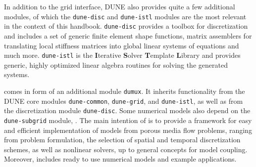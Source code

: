 In addition to the grid interface, DUNE also provides quite a few additional
modules, of which the \texttt{dune-disc} and \texttt{dune-istl} modules are the most
relevant in the context of this handbook.  \texttt{dune-disc} provides a toolbox for
discretization and includes a set of generic finite element shape
functions, matrix assemblers for translating local stiffness matrices
into global linear systems of equations and much more. \texttt{dune-istl} is the
\textbf{I}terative \textbf{S}olver \textbf{T}emplate \textbf{L}ibrary
and provides generic, highly optimized linear algebra routines for solving
the generated systems. 

\Dumux comes in form of an additional module \texttt{dumux}. 
It inherits functionality from the DUNE core modules 
\texttt{dune-common}, \texttt{dune-grid}, and \texttt{dune-istl}, as well as from 
the discretization module \texttt{dune-disc}. Some numerical models 
also depend on the \texttt{dune-subgrid} module, \cite{subgrid}. 
The main intention of \Dumux is to provide a framework for easy and efficient 
implementation of models from porous media flow problems, 
ranging from problem formulation, the selection of 
spatial and temporal discretization schemes, as well as nonlinear solvers,  
up to general concepts for model coupling.  
Moreover, \Dumux includes ready to use numerical models and example applications. 

